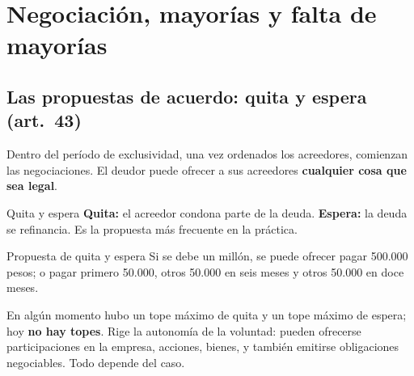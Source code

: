 \documentclass[12pt,oneside]{book}
\begin{document}
\chapter[Negociación y mayorías]{Negociación, mayorías y falta de mayorías}

\section{Las propuestas de acuerdo: quita y espera (art.\ 43)}

Dentro del período de exclusividad, una vez ordenados los acreedores, comienzan las negociaciones. El deudor puede ofrecer a sus acreedores \textbf{cualquier cosa que sea legal}.

\begin{definition}{Quita y espera}
\textbf{Quita:} el acreedor condona parte de la deuda. \textbf{Espera:} la deuda se refinancia. Es la propuesta más frecuente en la práctica.
\end{definition}

\begin{example}{Propuesta de quita y espera}
Si se debe un millón, se puede ofrecer pagar 500.000 pesos; o pagar primero 50.000, otros 50.000 en seis meses y otros 50.000 en doce meses.
\end{example}

En algún momento hubo un tope máximo de quita y un tope máximo de espera; hoy \textbf{no hay topes}.
Rige la autonomía de la voluntad: pueden ofrecerse participaciones en la empresa, acciones, bienes, y también emitirse obligaciones negociables. Todo depende del caso.
\end{document}
